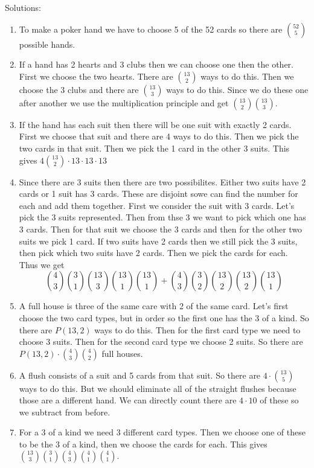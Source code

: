 \documentclass[14,fleqn]{article}
\begin{document}
Solutions:
\begin{enumerate}
	\item To make a poker hand we have to choose 5 of the 52 cards so there are $\binom{52}{5}$ possible hands.
	\item If a hand has 2 hearts and 3 clubs then we can choose one then the other. First we choose the two hearts. There are $\binom{13}{2}$ ways to do this. Then we choose the 3 clubs and there are $\binom{13}{3}$ ways to do this. Since we do these one after another we use the multiplication principle and get $\binom{13}{2}\binom{13}{3}.$
	\item If the hand has each suit then there will be one suit with exactly 2 cards. First we choose that suit and there are 4 ways to do this. Then we pick the two cards in that suit. Then we pick the 1 card in the other 3 suits. This gives $4\binom{13}{2}\cdot 13\cdot 13\cdot 13$
	\item Since there are 3 suits then there are two possibilites. Either two suits have 2 cards or 1 suit has 3 cards. These are disjoint sowe can find the number for each and add them together. First we consider the suit with 3 cards. Let's pick the 3 suits represented. Then from thse 3 we want to pick which one has 3 cards. Then for that suit we choose the 3 cards and then for the other two suits we pick 1 card. If two suits have 2 cards then we still pick the 3 suits, then pick which two suits have 2 cards. Then we pick the cards for each. Thus we get
		\[
			\binom{4}{3}\binom{3}{1}\binom{13}{3}\binom{13}{1}\binom{13}{1}+\binom{4}{3}\binom{3}{2}\binom{13}{2}\binom{13}{2}\binom{13}{1}
		\]
	\item A full house is three of the same care with 2 of the same card. Let's first choose the two card types, but in order so the first one has the 3 of a kind. So there are $P(13,2)$ ways to do this. Then for the first card type we need to choose 3 suits. Then for the second card type we choose 2 suits. So there are $P(13,2)\cdot \binom{4}{3}\binom{4}{2}$ full houses.
	\item A flush consists of a suit and 5 cards from that suit. So there are $4\cdot \binom{13}{5}$ ways to do this. But we should eliminate all of the straight flushes because those are a different hand. We can directly count there are $4\cdot 10$ of these so we subtract from before.
	\item For a 3 of a kind we need 3 different card types. Then we choose one of these to be the 3 of a kind, then we choose the cards for each. This gives $\binom{13}{3}\binom{3}{1}\binom{4}{3}\binom{4}{1}\binom{4}{1}.$
\end{enumerate}
\end{document}
